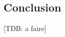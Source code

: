 \documentclass[a4paper]{article}
\begin{document}
%
%

\subsection*{Conclusion}

[TDB: a faire]
\end{document}
